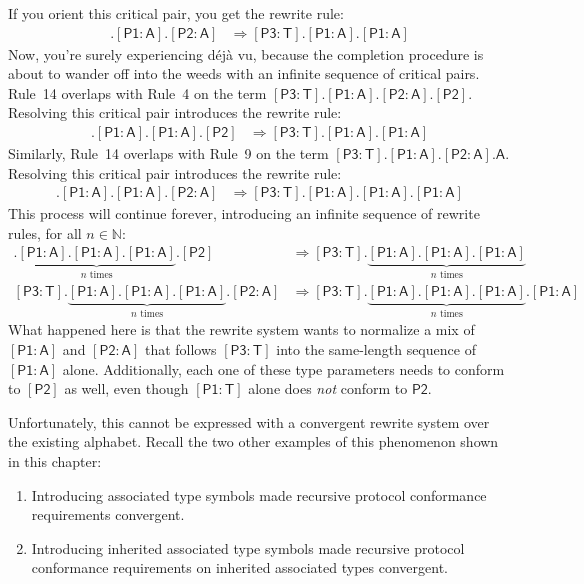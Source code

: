 \documentclass[a4paper,headsepline,bibliography=totoc,toc=flat,fleqn,twoside=semi]{scrbook}
\theoremstyle{definition}
\theoremstyle{definition}
\theoremstyle{definition}
\newcommand{\namesym}[1]{\mathsf{#1}}
\newcommand{\proto}[1]{\bm{\mathsf{#1}}}
\newcommand{\protosym}[1]{[\proto{#1}]}
\newcommand{\assocsym}[2]{[\proto{#1}\colon\namesym{#2}]}
\begin{document}
If you orient this critical pair, you get the rewrite rule:
\begin{align}
\assocsym{P3}{T}.\assocsym{P1}{A}.\assocsym{P2}{A}&\Rightarrow \assocsym{P3}{T}.\assocsym{P1}{A}.\assocsym{P1}{A}\tag{14}
\end{align}
Now, you're surely experiencing d\'ej\`a vu, because the completion procedure is about to wander off into the weeds with an infinite sequence of critical pairs. Rule~14 overlaps with Rule~4 on the term $\assocsym{P3}{T}.\assocsym{P1}{A}.\assocsym{P2}{A}.\protosym{P2}$. Resolving this critical pair introduces the rewrite rule:
\begin{align}
\assocsym{P3}{T}.\assocsym{P1}{A}.\assocsym{P1}{A}.\protosym{P2}&\Rightarrow \assocsym{P3}{T}.\assocsym{P1}{A}.\assocsym{P1}{A}\tag{15}
\end{align}
Similarly, Rule~14 overlaps with Rule~9 on the term $\assocsym{P3}{T}.\assocsym{P1}{A}.\assocsym{P2}{A}.\namesym{A}$. Resolving this critical pair introduces the rewrite rule:
\begin{align}
\assocsym{P3}{T}.\assocsym{P1}{A}.\assocsym{P1}{A}.\assocsym{P2}{A}&\Rightarrow \assocsym{P3}{T}.\assocsym{P1}{A}.\assocsym{P1}{A}.\assocsym{P1}{A}\tag{16}
\end{align}
This process will continue forever, introducing an infinite sequence of rewrite rules, for all $n\in\mathbb{N}$:
\begin{align*}
\assocsym{P3}{T}.\underbrace{\assocsym{P1}{A}.\assocsym{P1}{A}.\assocsym{P1}{A}}_{\text{$n$ times}}.\protosym{P2}&\Rightarrow \assocsym{P3}{T}.\underbrace{\assocsym{P1}{A}.\assocsym{P1}{A}.\assocsym{P1}{A}}_{\text{$n$ times}}\\
\assocsym{P3}{T}.\underbrace{\assocsym{P1}{A}.\assocsym{P1}{A}.\assocsym{P1}{A}}_{\text{$n$ times}}.\assocsym{P2}{A}&\Rightarrow \assocsym{P3}{T}.\underbrace{\assocsym{P1}{A}.\assocsym{P1}{A}.\assocsym{P1}{A}}_{\text{$n$ times}}.\assocsym{P1}{A}
\end{align*}
What happened here is that the rewrite system wants to normalize a mix of $\assocsym{P1}{A}$ and $\assocsym{P2}{A}$ that follows $\assocsym{P3}{T}$ into the same-length sequence of $\assocsym{P1}{A}$ alone. Additionally, each one of these type parameters needs to conform to $\protosym{P2}$ as well, even though $\assocsym{P1}{T}$ alone does \emph{not} conform to $\proto{P2}$.

Unfortunately, this cannot be expressed with a convergent rewrite system over the existing alphabet. Recall the two other examples of this phenomenon shown in this chapter:
\begin{enumerate}
\item Introducing associated type symbols made recursive protocol conformance requirements convergent.
\item Introducing inherited associated type symbols made recursive protocol conformance requirements on inherited associated types convergent.
\end{enumerate}
\end{document}
